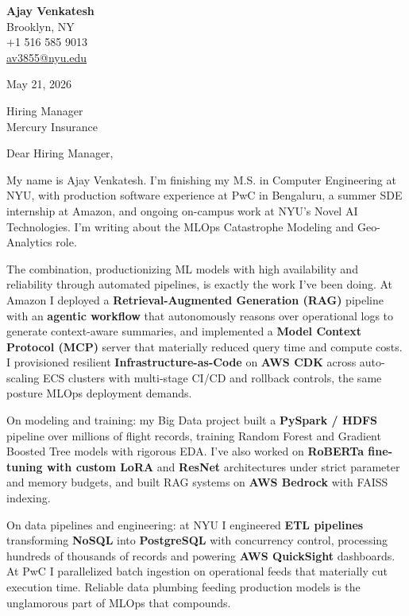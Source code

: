 \documentclass[letterpaper,11pt]{article}
\begin{document}
\begin{flushleft}
\textbf{\large Ajay Venkatesh} \\
Brooklyn, NY \\
+1 516 585 9013 \\
\href{mailto:av3855@nyu.edu}{av3855@nyu.edu}
\end{flushleft}
\vspace{10pt}
May 21, 2026
\vspace{6pt}

Hiring Manager \\
Mercury Insurance

\vspace{10pt}

Dear Hiring Manager,

My name is Ajay Venkatesh. I'm finishing my M.S. in Computer Engineering at NYU, with production software experience at PwC in Bengaluru, a summer SDE internship at Amazon, and ongoing on-campus work at NYU's Novel AI Technologies. I'm writing about the MLOps Catastrophe Modeling and Geo-Analytics role.

The combination, productionizing ML models with high availability and reliability through automated pipelines, is exactly the work I've been doing. At Amazon I deployed a \textbf{Retrieval-Augmented Generation (RAG)} pipeline with an \textbf{agentic workflow} that autonomously reasons over operational logs to generate context-aware summaries, and implemented a \textbf{Model Context Protocol (MCP)} server that materially reduced query time and compute costs. I provisioned resilient \textbf{Infrastructure-as-Code} on \textbf{AWS CDK} across auto-scaling ECS clusters with multi-stage CI/CD and rollback controls, the same posture MLOps deployment demands.

On modeling and training: my Big Data project built a \textbf{PySpark / HDFS} pipeline over millions of flight records, training Random Forest and Gradient Boosted Tree models with rigorous EDA. I've also worked on \textbf{RoBERTa fine-tuning with custom LoRA} and \textbf{ResNet} architectures under strict parameter and memory budgets, and built RAG systems on \textbf{AWS Bedrock} with FAISS indexing.

On data pipelines and engineering: at NYU I engineered \textbf{ETL pipelines} transforming \textbf{NoSQL} into \textbf{PostgreSQL} with concurrency control, processing hundreds of thousands of records and powering \textbf{AWS QuickSight} dashboards. At PwC I parallelized batch ingestion on operational feeds that materially cut execution time. Reliable data plumbing feeding production models is the unglamorous part of MLOps that compounds.
\end{document}
